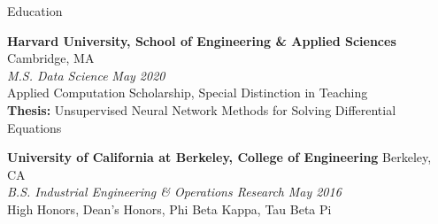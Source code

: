\documentclass{resume} %
\begin{document}

\begin{rSection}{Education}

{\bf Harvard University, School of Engineering \& Applied Sciences} \hfill { Cambridge, MA}
	\\ {\em M.S. Data Science} \hfill {\em May 2020}
	\\ Applied Computation Scholarship, Special Distinction in Teaching
	\\ {\bf Thesis:} Unsupervised Neural Network Methods for Solving Differential Equations

{\bf University of California at Berkeley, College of Engineering} \hfill {Berkeley, CA}
	\\ {\em B.S. Industrial Engineering \& Operations Research} \hfill {\em May 2016}
	\\ High Honors, Dean's Honors, Phi Beta Kappa, Tau Beta Pi

\end{rSection}

\end{document}
